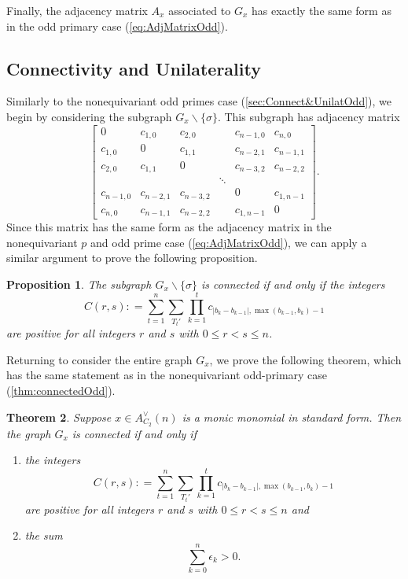 \documentclass{amsart}
\newtheorem{theorem}{Theorem}[section]
\newtheorem{proposition}[theorem]{Proposition}
\theoremstyle{definition}
\theoremstyle{plain}
\numberwithin{theorem}{section}
\numberwithin{equation}{section}
\numberwithin{figure}{section}
\newcommand{\0}{\langle 0 \rangle }
\begin{document}
Finally, the adjacency matrix $A_x$ associated to $G_x$ has exactly the same form as in the odd primary case (\ref{eq:AdjMatrixOdd}).
 
\subsection{Connectivity and Unilaterality} Similarly to the nonequivariant odd primes case (\textsection \ref{sec:Connect&UnilatOdd}), we begin by considering the subgraph $G_x \backslash \{ \sigma \}$. This subgraph has adjacency matrix 
\[
\begin{bmatrix}
    0 & c_{1,0} & c_{2,0} & & c_{n-1,0} & c_{n,0} \\
    c_{1,0} & 0 & c_{1,1} & & c_{n-2,1} & c_{n-1,1} \\
    c_{2,0} & c_{1,1} & 0 & & c_{n-3,2} & c_{n-2,2} \\
    &  &  & \ddots & \\
    c_{n-1,0} & c_{n-2,1} & c_{n-3,2} & & 0 & c_{1,n-1} \\
    c_{n,0} & c_{n-1,1} & c_{n-2,2} & & c_{1,n-1} & 0 
\end{bmatrix}.
\]
{ Since} this matrix has the same form as the adjacency matrix in the nonequivariant $p$ and odd prime case (\ref{eq:AdjMatrixOdd}), we can apply a similar argument to prove the following proposition. 
\begin{proposition}
    The subgraph $G_x \backslash \{\sigma\}$ is connected if and only if the integers
    \[
    C(r,s) : = \sum_{t = 1}^n \sum_{T_t'} \prod_{k = 1}^t c_{|b_k-b_{k-1}|, \max (b_{k-1}, b_k)-1} 
    \]
    are positive for all integers $r$ and $s$ with $0 \leq r < s \leq n$. 
\end{proposition}
Returning to consider the entire graph $G_x$, we prove the following theorem, which has the same statement as in the { nonequivariant odd-primary case} (\cref{thm:connectedOdd}). 
\begin{theorem} \label{thm:connectedC2}
     Suppose $x \in A_{C_2}^\vee(n)$ is a monic monomial { in standard form}. Then the graph $G_x$ is connected if and only if 
    \begin{enumerate}
        \item the integers 
        \[
        C(r,s) : = \sum_{t = 1}^n \sum_{T_t'} \prod_{k = 1}^t c_{|b_k-b_{k-1}|, \max (b_{k-1}, b_k)-1} 
        \]
        are positive for all integers $r$ and $s$ with $0 \leq r < s \leq n$ and
        \item the sum 
        \[
        \sum_{k=0}^n \epsilon_k > 0.
        \]
    \end{enumerate}
\end{theorem}
\end{document}
